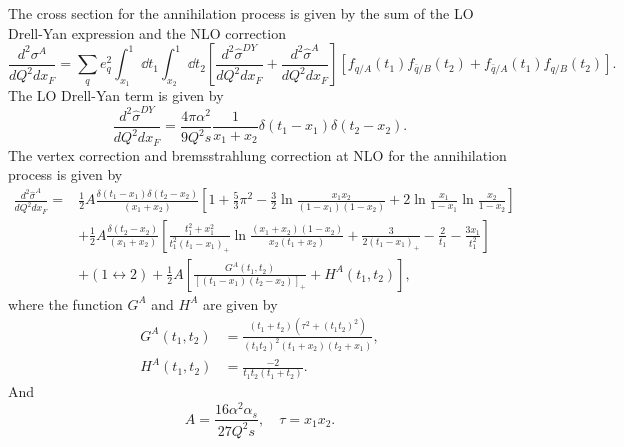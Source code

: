 The cross section for the annihilation process is given by the sum of the LO Drell-Yan expression and
the NLO correction \cite{kubar1980}
\begin{equation}
	\frac{d^2\sigma^A}{dQ^2dx_{F}} = \sum_q e^2_q \int^1_{x_1} \dd{t_1} \int^1_{x_2} \dd{t_2}
	\left[ \frac{d^2\hat{\sigma}^{DY}}{dQ^2dx_F}+\frac{d^2\hat{\sigma}^{A}}{dQ^2dx_F} \right]
	\left[f_{q/A}\left(t_1\right)f_{\bar{q}/B}\left(t_2\right) +
	f_{\bar{q}/A}\left(t_1\right)f_{q/B}\left(t_2\right)
	\right].
\end{equation}
The LO Drell-Yan term is given by
\begin{equation}
	\frac{ d^2\hat{\sigma}^{DY} }{dQ^2 dx_F} = \frac{4\pi\alpha^2}{9Q^2 s} \frac{1}{x_1+x_2}\delta\left(t_1-x_1\right)\delta\left(t_2-x_2\right).
\end{equation}
The vertex correction and bremsstrahlung correction at NLO for the annihilation process is given by
\begin{equation}
\begin{split}
	\frac{d^2\hat{\sigma}^{A}}{dQ^2dx_F} =& \frac{1}{2}A \frac{\delta\left(t_1-x_1\right)\delta\left(t_2-x_2\right)}{\left(x_1+x_2\right)} \left[ 1+\frac{5}{3}\pi^2 - \frac{3}{2}\ln\frac{x_1x_2}{\left(1-x_1\right)\left(1-x_2\right)} + 2\ln\frac{x_1}{1-x_1}\ln\frac{x_2}{1-x_2}\right]\\
	&+\frac{1}{2} A \frac{\delta\left(t_2-x_2\right)}{\left(x_1+x_2\right)}\left[\frac{t_1^2+x_1^2}{t_1^2\left(t_1-x_1\right)_{+}} \ln\frac{\left(x_1+x_2\right)\left(1-x_2\right)}{x_2\left(t_1+x_2\right)} + \frac{3}{2\left(t_1-x_1\right)_{+}} -\frac{2}{t_1} - \frac{3x_1}{t_1^2}\right]\\
	&+\left(1\leftrightarrow 2\right) + \frac{1}{2} A \left[\frac{G^A\left(t_1,t_2\right)}{\left[\left(t_1-x_1\right)\left(t_2-x_2\right)\right]_{+}} +H^A\left(t_1,t_2\right)\right],
\end{split}
\end{equation}
where the function $G^A$ and $H^A$ are given by
\begin{align}
	G^A\left(t_1,t_2\right) &= \frac{\left(t_1+t_2\right)\left(\tau^2+\left(t_1t_2\right)^2\right)}{\left(t_1t_2\right)^2\left(t_1+x_2\right)\left(t_2+x_1\right)},\\
	H^A\left(t_1,t_2\right) &= \frac{-2}{t_1t_2\left(t_1+t_2\right)}.
\end{align}
And
\begin{equation}
	A=\frac{16\alpha^2\alpha_s}{27Q^2s}, \quad \tau=x_1x_2.
\end{equation}

